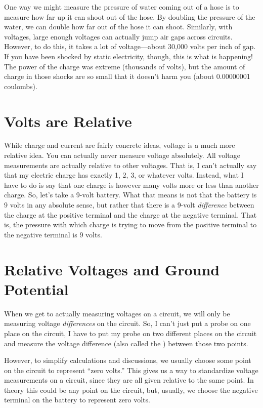 One way we might measure the pressure of water coming out of a hose is to measure how far up it can shoot out of the hose.
By doubling the pressure of the water, we can double how far out of the hose it can shoot.
Similarly, with voltages, large enough voltages can actually jump air gaps across circuits.
However, to do this, it takes a lot of voltage---about 30,000 volts per inch of gap.
If you have been shocked by static electricity, though, this is what is happening!
The power of the charge was extreme (thousands of volts), but the amount of charge in those shocks are so small that it doesn't harm you (about 0.00000001 coulombs).

\section{Volts are Relative}

While charge and current are fairly concrete ideas, voltage is a much more relative idea.
You can actually never measure voltage absolutely.
All voltage measurements are actually relative to other voltages.
That is, I can't actually say that my electric charge has exactly 1, 2, 3, or whatever volts.
Instead, what I have to do is say that one charge is however many volts more or less than another charge.
So, let's take a 9-volt battery.
What that means is not that the battery is 9 volts in any absolute sense, but rather that there is a 9-volt \emph{difference} between the charge at the positive terminal and the charge at the negative terminal.
That is, the pressure with which charge is trying to move from the positive terminal to the negative terminal is 9 volts.

\section{Relative Voltages and Ground Potential}

When we get to actually measuring voltages on a circuit, we will only be measuring voltage \emph{differences} on the circuit.
So, I can't just put a probe on one place on the circuit, I have to put my probe on two different places on the circuit and measure the voltage difference (also called the ) between those two points.

However, to simplify calculations and discussions, we usually choose some point on the circuit to represent ``zero volts.''
This gives us a way to standardize voltage measurements on a circuit, since they are all given relative to the same point.
In theory this could be any point on the circuit, but, usually, we choose the negative terminal on the battery to represent zero volts.

